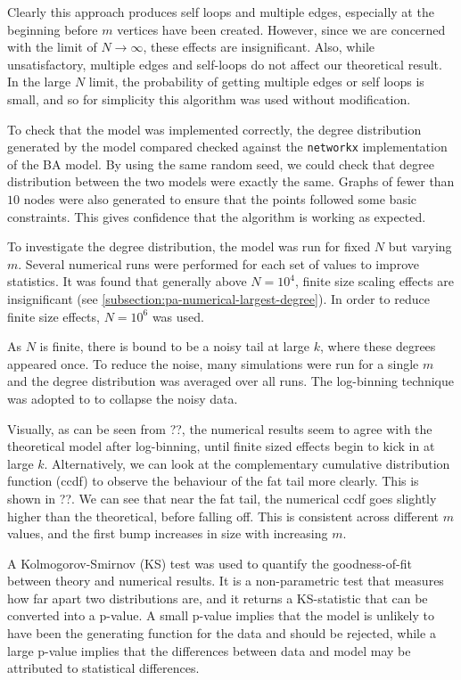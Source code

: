 Clearly this approach produces self loops and multiple edges, especially at the beginning before $m$ vertices have been created. However, since we are concerned with the limit of $N \rightarrow \infty$, these effects are insignificant. Also, while unsatisfactory, multiple edges and self-loops do not affect our theoretical result. In the large $N$ limit, the probability of getting multiple edges or self loops is small, and so for simplicity this algorithm was used without modification. 

To check that the model was implemented correctly, the degree distribution generated by the model compared checked against the \texttt{networkx} implementation of the BA model. By using the same random seed, we could check that degree distribution between the two models were exactly the same. Graphs of fewer than $10$ nodes were also generated to ensure that the points followed some basic constraints. This gives confidence that the algorithm is working as expected. 

To investigate the degree distribution, the model was run for fixed $N$ but varying $m$. Several numerical runs were performed for each set of values to improve statistics. It was found that generally above $N=10^4$, finite size scaling effects are insignificant (see \autoref{subsection:pa-numerical-largest-degree}). In order to reduce finite size effects, $N=10^6$ was used. 

As $N$ is finite, there is bound to be a noisy tail at large $k$, where these degrees appeared once. To reduce the noise, many simulations were run for a single $m$ and the degree distribution was averaged over all runs. The log-binning technique \citep{Christensen:2005} was adopted to to collapse the noisy data. 

Visually, as can be seen from ??, the numerical results seem to agree with the theoretical model after log-binning, until finite sized effects begin to kick in at large $k$. Alternatively, we can look at the complementary cumulative distribution function (ccdf) to observe the behaviour of the fat tail more clearly. This is shown in ??. We can see that near the fat tail, the numerical ccdf goes slightly higher than the theoretical, before falling off. This is consistent across different $m$ values, and the first bump increases in size with increasing $m$. 

A Kolmogorov-Smirnov (KS) test was used to quantify the goodness-of-fit between theory and numerical results. It is a non-parametric test that measures how far apart two distributions are, and it returns a KS-statistic that can be converted into a p-value. A small p-value implies that the model is unlikely to have been the generating function for the data and should be rejected, while a large p-value implies that the differences between data and model may be attributed to statistical differences. 

